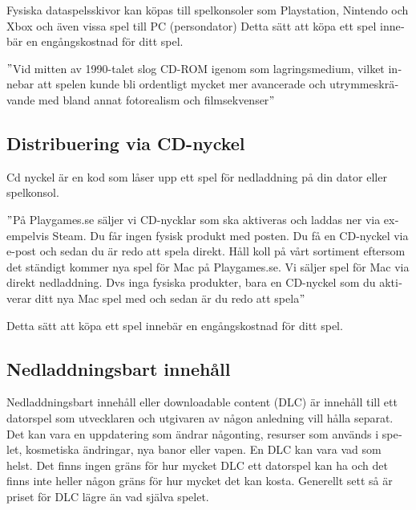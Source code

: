 \documentclass[11p]{article}
\begin{document}
\begin{otherlanguage}{swedish}
        \setlength{\leftskip}{0cm}

        Fysiska dataspelsskivor kan köpas till spelkonsoler som Playstation, Nintendo och Xbox och även vissa spel till PC (persondator)
        Detta sätt att köpa ett spel innebär en engångskostnad för ditt spel.

        \setlength{\leftskip}{1cm}

        \("\)Vid mitten av 1990-talet slog CD-ROM igenom som lagringsmedium, vilket innebar att spelen kunde bli ordentligt mycket mer avancerade och utrymmeskrävande med bland annat fotorealism och filmsekvenser\("\) \parencite{nyckel}

        \setlength{\leftskip}{0cm}

        \subsection{Distribuering via CD-nyckel}
        Cd nyckel är en kod som låser upp ett spel för nedladdning på din dator eller spelkonsol.

        \setlength{\leftskip}{1cm}
        \("\)På Playgames.se säljer vi CD-nycklar som ska aktiveras och laddas ner via exempelvis Steam.
        Du får ingen fysisk produkt med posten.
        Du få en CD-nyckel via e-post och sedan du är redo att spela direkt.
        Håll koll på vårt sortiment eftersom det ständigt kommer nya spel för Mac på Playgames.se.
        Vi säljer spel för Mac via direkt nedladdning.
        Dvs inga fysiska produkter, bara en CD-nyckel som du aktiverar ditt nya Mac spel med och sedan är du redo att spela\("\)\parencite{playgames}

        \setlength{\leftskip}{0cm}
        Detta sätt att köpa ett spel innebär en engångskostnad för ditt spel.
        
        \subsection{Nedladdningsbart innehåll}
        Nedladdningsbart innehåll eller downloadable content (DLC) är innehåll till ett datorspel som utvecklaren och utgivaren av någon anledning vill hålla separat.
        Det kan vara en uppdatering som ändrar någonting, resurser som används i spelet, kosmetiska ändringar, nya banor eller vapen.
        En DLC kan vara vad som helst.
        Det finns ingen gräns för hur mycket DLC ett datorspel kan ha och det finns inte heller någon gräns för hur mycket det kan kosta.
        Generellt sett så är priset för DLC lägre än vad själva spelet.


\end{otherlanguage}
\end{document}
